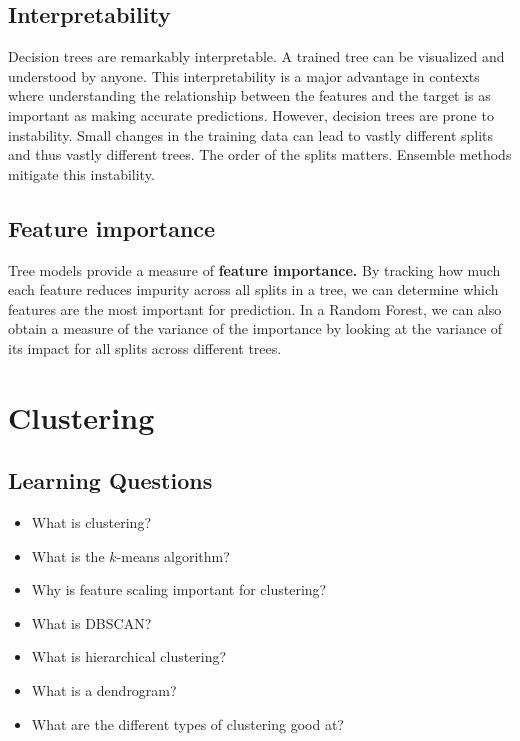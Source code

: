 \subsection*{Interpretability}
Decision trees are remarkably interpretable. A trained tree can be visualized and understood by anyone. This interpretability is a major advantage in contexts where understanding the relationship between the features and the target is as important as making accurate predictions. However, decision trees are prone to instability. Small changes in the training data can lead to vastly different splits and thus vastly different trees. The order of the splits matters. Ensemble methods mitigate this instability.

\subsection*{Feature importance}
Tree models provide a measure of \textbf{feature importance.} By tracking how much each feature reduces impurity across all splits in a tree, we can determine which features are the most important for prediction. In a Random Forest, we can also obtain a measure of the variance of the importance by looking at the variance of its impact for all splits across different trees. 

\clearpage
\section{Clustering}
\subsection*{Learning Questions}
\begin{itemize}
    \item What is clustering?
    \item What is the $k$-means algorithm?
    \item Why is feature scaling important for clustering?
    \item What is DBSCAN?
    \item What is hierarchical clustering?
    \item What is a dendrogram?
    \item What are the different types of clustering good at?
\end{itemize}
